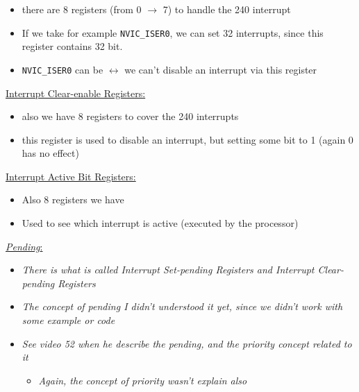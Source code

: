 \begin{itemize}

\item there are 8 registers (from 0 $\rightarrow$ 7) to handle the 240 interrupt

\item If we take for example \verb|NVIC_ISER0|, we can set 32 interrupts, since this register contains 32 bit.

\item \verb|NVIC_ISER0| can be  $\leftrightarrow$ we can't disable an interrupt via this register

\end{itemize}

\underline{Interrupt Clear-enable Registers:}

\begin{itemize}

\item also we have 8 registers to cover the 240 interrupts

\item this register is used to disable an interrupt, but setting some bit to 1 (again 0 has no effect)

\end{itemize}

\underline{Interrupt Active Bit Registers:}

\begin{itemize}

\item Also 8 registers we have

\item Used to see which interrupt is active (executed by the processor)

\end{itemize}

\underline{\textit{Pending}:}  

\begin{itemize}

\item \textit{There is what is called Interrupt Set-pending Registers and Interrupt Clear-pending Registers}

\item \textit{The concept of pending I didn't understood it yet, since we didn't work with some example or code}

\item \textit{See video 52 when he describe the pending, and the priority concept related to it}

	\begin{itemize}
	\item \textit{Again, the concept of priority wasn't explain also}
	\end{itemize}

\end{itemize}



